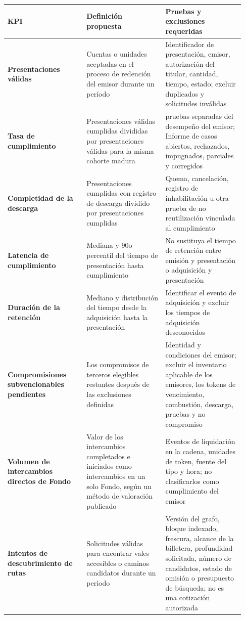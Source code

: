 \documentclass[11pt]{article}
\begin{document}
\begin{longtable}{P{0.31\linewidth} P{0.31\linewidth} P{0.31\linewidth}}
\toprule
KPI & Definición propuesta & Pruebas y exclusiones requeridas \\
\midrule
\endhead
\textbf{Presentaciones válidas} & Cuentas o unidades aceptadas en el proceso de redención del emisor durante un período & Identificador de presentación, emisor, autorización del titular, cantidad, tiempo, estado; excluir duplicados y solicitudes inválidas \\
\textbf{Tasa de cumplimiento} & Presentaciones válidas cumplidas divididas por presentaciones válidas para la misma cohorte madura & pruebas separadas del desempeño del emisor; Informe de casos abiertos, rechazados, impugnados, parciales y corregidos \\
\textbf{Completidad de la descarga} & Presentaciones cumplidas con registro de descarga dividido por presentaciones cumplidas & Quema, cancelación, registro de inhabilitación u otra prueba de no reutilización vinculada al cumplimiento \\
\textbf{Latencia de cumplimiento} & Mediana y 90o percentil del tiempo de presentación hasta cumplimiento & No sustituya el tiempo de retención entre emisión y presentación o adquisición y presentación \\
\textbf{Duración de la retención} & Mediano y distribución del tiempo desde la adquisición hasta la presentación & Identificar el evento de adquisición y excluir los tiempos de adquisición desconocidos \\
\textbf{Compromisiones subvencionables pendientes} & Los compromisos de terceros elegibles restantes después de las exclusiones definidas & Identidad y condiciones del emisor; excluir el inventario aplicable de los emisores, los tokens de vencimiento, combustión, descarga, pruebas y no compromiso \\
\textbf{Volumen de intercambios directos de Fondo} & Valor de los intercambios completados e iniciados como intercambios en un solo Fondo, según un método de valoración publicado & Eventos de liquidación en la cadena, unidades de token, fuente del tipo y hora; no clasificarlos como cumplimiento del emisor \\
\textbf{Intentos de descubrimiento de rutas} & Solicitudes válidas para encontrar vales accesibles o caminos candidatos durante un periodo & Versión del grafo, bloque indexado, frescura, alcance de la billetera, profundidad solicitada, número de candidatos, estado de omisión o presupuesto de búsqueda; no es una cotización autorizada \\

\end{longtable}
\end{document}
